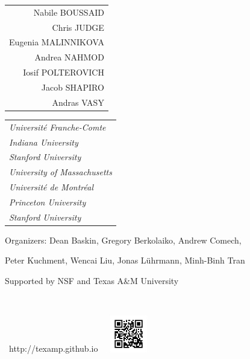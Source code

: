 \documentclass[a3,portrait]{a0poster}
\begin{document}
\bf
\normalsize
\Large
\hskip -1.9cm
\begin{tabular}{r}
Nabile BOUSSAID
\\
Chris JUDGE
\\
Eugenia MALINNIKOVA
\\
Andrea NAHMOD
\\
Iosif POLTEROVICH
\\
Jacob SHAPIRO
\\
Andras VASY
\end{tabular}
\begin{tabular}{l}
\it
Universit\'{e} Franche-Comte
\\
\it
Indiana University
\\
\it
Stanford University
\\
\it
University of Massachusetts
\\
\it
Universit\'{e} de Montr\'{e}al
\\
\it
Princeton University
\\
\it
Stanford University
\end{tabular}


\vskip 3cm

\color{MidnightBlue}

\normalsize

{\bsifamily Organizers:}
Dean Baskin, Gregory Berkolaiko, Andrew Comech,

Peter Kuchment,
Wencai Liu, Jonas L\"{u}hrmann, Minh-Binh Tran


\vskip 0.5cm

\hskip 4cm
Supported by NSF and
Texas A\&M University


\vskip 1cm

\hskip 11.7cm
\mbox{
\normalsize
}


\vskip -16mm

\hskip 12cm
\mbox{
http://texamp.github.io
   \ \ \includegraphics[height=16mm,trim=0 11mm 0 -11mm]{texamp-2024-qr.png}
}
\end{document}
